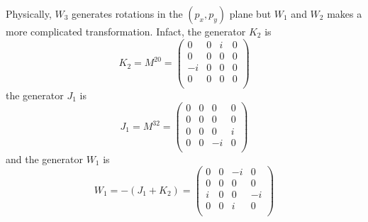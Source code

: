     Physically, $W_3$ generates rotations in the $(p_x, p_y)$ plane but $W_1$ and $W_2$ makes a more complicated transformation. Infact, the generator $K_2$ is
    \begin{equation*}
        K_2 = M^{20} = \begin{pmatrix}
            0 & 0 & i & 0 \\
            0 & 0 & 0 & 0 \\
            -i & 0 & 0 & 0 \\
            0 & 0 & 0 & 0 \\
        \end{pmatrix}
    \end{equation*}
    the generator $J_1$ is 
    \begin{equation*}
        J_1 = M^{32} = \begin{pmatrix}
            0 & 0 & 0 & 0 \\
            0 & 0 & 0 & 0 \\
            0 & 0 & 0 & i \\
            0 & 0 & -i & 0 \\
        \end{pmatrix}
    \end{equation*}
    and the generator $W_1$ is 
    \begin{equation*}
        W_1 = - (J_1 + K_2) = \begin{pmatrix}
            0 & 0 & -i & 0 \\
            0 & 0 & 0 & 0 \\
            i & 0 & 0 & -i \\
            0 & 0 & i & 0 \\
        \end{pmatrix}
    \end{equation*}

